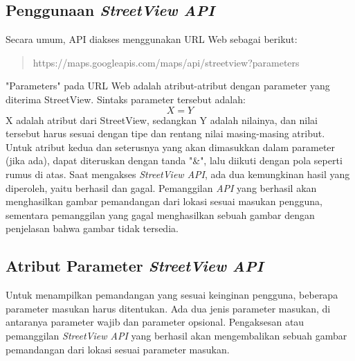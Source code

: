 \subsection{Penggunaan {\it StreetView API}}
\label{subs:streetview-usage}
Secara umum, API diakses menggunakan URL Web sebagai berikut:
\begin{quote}
https://maps.googleapis.com/maps/api/streetview?parameters
\end{quote}
"Parameters" pada URL Web adalah atribut-atribut dengan parameter yang diterima StreetView. Sintaks parameter tersebut adalah: $$ X = Y $$
X adalah atribut dari StreetView, sedangkan Y adalah nilainya, dan nilai tersebut harus sesuai dengan tipe dan rentang nilai masing-masing atribut. Untuk atribut kedua dan seterusnya yang akan dimasukkan dalam parameter (jika ada), dapat diteruskan dengan tanda "\&", lalu diikuti dengan pola seperti rumus di atas. Saat mengakses {\it StreetView API}, ada dua kemungkinan hasil yang diperoleh, yaitu berhasil dan gagal. Pemanggilan \textit{API} yang berhasil akan menghasilkan gambar pemandangan dari lokasi sesuai masukan pengguna, sementara pemanggilan yang gagal menghasilkan sebuah gambar dengan penjelasan bahwa gambar tidak tersedia. 


\subsection{Atribut Parameter {\it StreetView API}}
\label{subs:parameter}
Untuk menampilkan pemandangan yang sesuai keinginan pengguna, beberapa parameter masukan harus ditentukan. Ada dua jenis parameter masukan, di antaranya parameter wajib dan parameter opsional. Pengaksesan atau pemanggilan {\it StreetView API} yang berhasil akan mengembalikan sebuah gambar pemandangan dari lokasi sesuai parameter masukan. 


